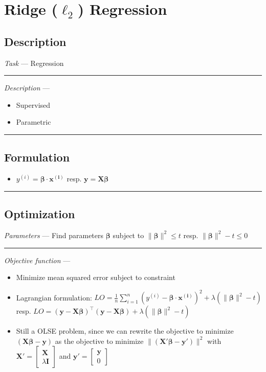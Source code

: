 \section{Ridge ($\ell_2$) Regression}
\subsection*{Description}
\emph{Task} --- Regression

{\color{lightgray}\hrule height 0.001mm}

\emph{Description} --- 
\begin{itemize}
    \item Supervised 
    \item Parametric
\end{itemize}

{\color{black}\hrule height 0.001mm}

\subsection*{Formulation}

\begin{itemize}
    \item $y^{(i)} = \boldsymbol{\beta} \cdot \boldsymbol{x^{(i)}}$ resp. $\boldsymbol{y} = \boldsymbol{X}\boldsymbol{\beta}$
\end{itemize}

{\color{black}\hrule height 0.001mm}

\subsection*{Optimization}
\emph{Parameters} --- Find parameters $\boldsymbol{\beta}$ subject to $\|\boldsymbol{\beta}\|^2 \leq t$ resp. $\|\boldsymbol{\beta}\|^2 - t \leq 0$

{\color{lightgray}\hrule height 0.001mm}

\emph{Objective function} --- 
\begin{itemize}
    \item Minimize mean squared error subject to constraint
    \item Lagrangian formulation: $LO = \frac{1}{n} \sum_{i=1}^n ( y^{(i)} - \boldsymbol{\beta} \cdot \boldsymbol{x^{(i)}} )^2 + \lambda ( \|\boldsymbol{\beta}\|^2 - t )$ resp. $LO = ( \boldsymbol{y} - \boldsymbol{X}\boldsymbol{\beta})^\intercal( \boldsymbol{y} - \boldsymbol{X}\boldsymbol{\beta} ) + \lambda ( \|\boldsymbol{\beta}\|^2 - t )$
    \item Still a OLSE problem, since we can rewrite the objective to minimize $(\boldsymbol{X}\boldsymbol{\beta} - \boldsymbol{y})$ as the objective to minimize $\|(\boldsymbol{X}'\boldsymbol{\beta} - \boldsymbol{y}')\|^2$ with $\boldsymbol{X}' = 
    \begin{bmatrix} 
    \boldsymbol{X} \\
    \lambda \boldsymbol{I}
    \end{bmatrix}$ 
    and $\boldsymbol{y}' = 
    \begin{bmatrix} 
    \boldsymbol{y} \\
    0
    \end{bmatrix}$
\end{itemize}

